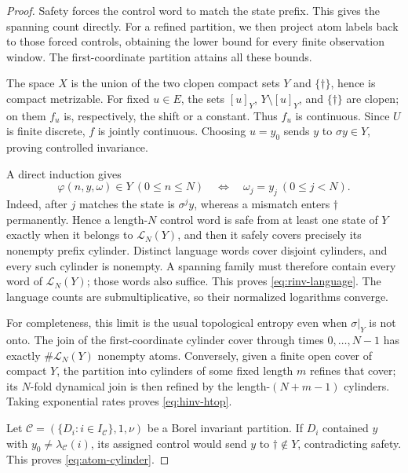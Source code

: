 \documentclass[11pt,reqno]{amsart}
\numberwithin{equation}{section}
\theoremstyle{definition}
\theoremstyle{definition}
\newcommand{\C}{\mathcal C}
\newcommand{\Lcal}{\mathcal L}
\begin{document}
\begin{proof}
Safety forces the control word to match the state prefix. This gives
the spanning count directly. For a refined partition, we then project
atom labels back to those forced controls, obtaining the lower bound
for every finite observation window. The first-coordinate partition
attains all these bounds.

The space $X$ is the union of the two clopen compact sets $Y$ and
$\{\dagger\}$, hence is compact metrizable.  For fixed $u\in E$, the sets
$[u]_Y$, $Y\setminus[u]_Y$, and $\{\dagger\}$ are clopen; on them $f_u$ is,
respectively, the shift or a constant.  Thus $f_u$ is continuous.  Since $U$
is finite discrete, $f$ is jointly continuous.  Choosing $u=y_0$ sends $y$
to $\sigma y\in Y$, proving controlled invariance.

A direct induction gives
\begin{equation}\label{eq:safe-iff-match}
 \varphi(n,y,\omega)\in Y\ (0\le n\le N)
 \quad\Longleftrightarrow\quad
 \omega_j=y_j\ (0\le j<N).
\end{equation}
Indeed, after $j$ matches the state is $\sigma^j y$, whereas a mismatch enters
$\dagger$ permanently.  Hence a length-$N$ control word is safe from at
least one state of $Y$ exactly when it belongs to $\Lcal_N(Y)$, and then it
safely covers precisely its nonempty prefix cylinder.  Distinct language
words cover disjoint cylinders, and every such cylinder is nonempty.
A spanning family must therefore contain every word of $\Lcal_N(Y)$;
those words also suffice. This proves \eqref{eq:rinv-language}.  The language counts are
submultiplicative, so their normalized logarithms converge.

For completeness, this limit is the usual topological entropy even when
$\sigma|_Y$ is not onto.  The join of the first-coordinate cylinder cover
through times $0,\ldots,N-1$ has exactly $\#\Lcal_N(Y)$ nonempty atoms.
Conversely, given a finite open cover of compact $Y$, the partition into
cylinders of some fixed length $m$ refines that cover; its $N$-fold dynamical join is
then refined by the length-$(N+m-1)$ cylinders.  Taking exponential rates proves
\eqref{eq:hinv-htop}.

Let $\C=(\{D_i:i\in I_\C\},1,\nu)$ be a Borel invariant partition.  If
$D_i$ contained $y$ with $y_0\ne\lambda_\C(i)$, its assigned control would send $y$ to
$\dagger\notin Y$, contradicting safety.  This proves
\eqref{eq:atom-cylinder}.


\end{proof}
\end{document}
